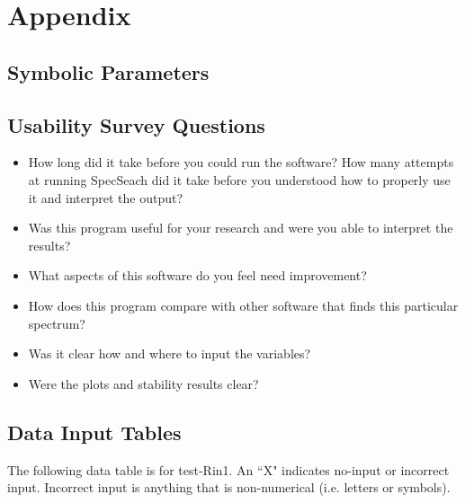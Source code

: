 \documentclass[12pt, titlepage]{article}
\begin{document}
\newpage

\section{Appendix}

\subsection{Symbolic Parameters}
\label{SymbolicParameters} 
\subsection{Usability Survey Questions}
\label{UsabilitySurvey}
\begin{itemize}
	\item How long did it take before you could run the software? How many 
	attempts at running SpecSeach did it take before you understood how to 
	properly use it and interpret the output?
	\item Was this program useful for your research and were you able to 
	interpret the results? 
	\item What aspects of this software do you feel need improvement?
	\item How does this program compare with other software that finds this 
	particular spectrum? 
	\item Was it clear how and where to input the variables? 
	\item Were the plots and stability results clear? 
\end{itemize} 

\newpage
\subsection{Data Input Tables} 
\label{datainput}
The following data table is for test-Rin1. An ``X" indicates no-input or 
incorrect input. Incorrect input is anything that is non-numerical (i.e. 
letters 
or symbols). 
\end{document}

